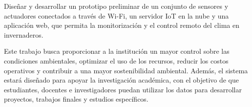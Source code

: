 Diseñar y desarrollar un prototipo preliminar de un conjunto de sensores y actuadores conectados a través de Wi-Fi, un servidor IoT en la nube y
una aplicación web, que permita la monitorización y el control remoto del clima en invernaderos. 

Este trabajo busca proporcionar a la institución un mayor control sobre las condiciones ambientales, optimizar el uso de los recursos, reducir los costos 
operativos y contribuir a una mayor sostenibilidad ambiental. Además, el sistema estará diseñado para apoyar la investigación académica, con el objetivo 
de que estudiantes, docentes e investigadores puedan utilizar los datos para desarrollar proyectos, trabajos finales y estudios específicos.

